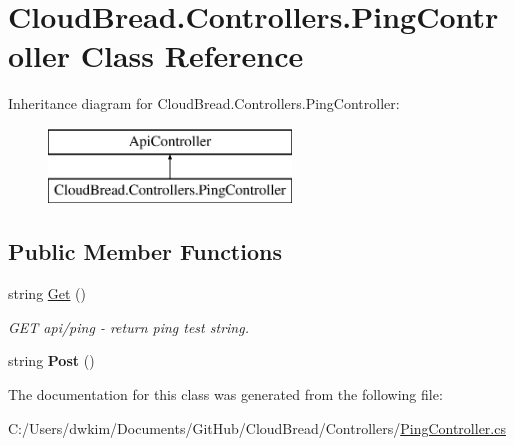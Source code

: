 \hypertarget{a00083}{}\section{Cloud\+Bread.\+Controllers.\+Ping\+Controller Class Reference}
\label{a00083}
Inheritance diagram for Cloud\+Bread.\+Controllers.\+Ping\+Controller\+:\begin{figure}[H]
\begin{center}
\leavevmode
\includegraphics[height=2.000000cm]{a00083}
\end{center}
\end{figure}
\subsection*{Public Member Functions}
\begin{DoxyCompactItemize}
\item 
string \hyperlink{a00083_a522bb782fa548bc7cc0596da2332dab4}{Get} ()\hypertarget{a00083_a522bb782fa548bc7cc0596da2332dab4}{}\label{a00083_a522bb782fa548bc7cc0596da2332dab4}

\begin{DoxyCompactList}\small\item\em G\+ET api/ping -\/ return ping test string. \end{DoxyCompactList}\item 
string {\bfseries Post} ()\hypertarget{a00083_a55bcbbd6f8f97d1b9f7b480f5a3c754a}{}\label{a00083_a55bcbbd6f8f97d1b9f7b480f5a3c754a}

\end{DoxyCompactItemize}


The documentation for this class was generated from the following file\+:\begin{DoxyCompactItemize}
\item 
C\+:/\+Users/dwkim/\+Documents/\+Git\+Hub/\+Cloud\+Bread/\+Controllers/\hyperlink{a00163}{Ping\+Controller.\+cs}\end{DoxyCompactItemize}
